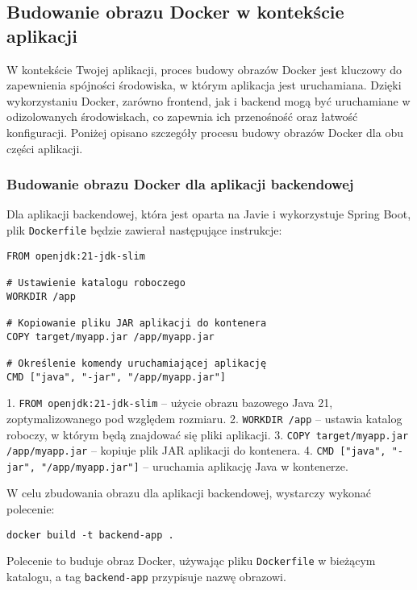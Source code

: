 \subsection{Budowanie obrazu Docker w kontekście aplikacji}

W kontekście Twojej aplikacji, proces budowy obrazów Docker jest kluczowy do zapewnienia spójności środowiska, w którym aplikacja jest uruchamiana. Dzięki wykorzystaniu Docker, zarówno frontend, jak i backend mogą być uruchamiane w odizolowanych środowiskach, co zapewnia ich przenośność oraz łatwość konfiguracji. Poniżej opisano szczegóły procesu budowy obrazów Docker dla obu części aplikacji.

\subsubsection{Budowanie obrazu Docker dla aplikacji backendowej}

Dla aplikacji backendowej, która jest oparta na Javie i wykorzystuje Spring Boot, plik \texttt{Dockerfile} będzie zawierał następujące instrukcje:

\begin{verbatim}
FROM openjdk:21-jdk-slim

# Ustawienie katalogu roboczego
WORKDIR /app

# Kopiowanie pliku JAR aplikacji do kontenera
COPY target/myapp.jar /app/myapp.jar

# Określenie komendy uruchamiającej aplikację
CMD ["java", "-jar", "/app/myapp.jar"]
\end{verbatim}

1. \texttt{FROM openjdk:21-jdk-slim} – użycie obrazu bazowego Java 21, zoptymalizowanego pod względem rozmiaru.
2. \texttt{WORKDIR /app} – ustawia katalog roboczy, w którym będą znajdować się pliki aplikacji.
3. \texttt{COPY target/myapp.jar /app/myapp.jar} – kopiuje plik JAR aplikacji do kontenera.
4. \texttt{CMD ["java", "\texttt{-}jar", "/app/myapp.jar"]} – uruchamia aplikację Java w kontenerze.

W celu zbudowania obrazu dla aplikacji backendowej, wystarczy wykonać polecenie:

\begin{verbatim}
docker build -t backend-app .
\end{verbatim}

Polecenie to buduje obraz Docker, używając pliku \texttt{Dockerfile} w bieżącym katalogu, a tag \texttt{backend-app} przypisuje nazwę obrazowi.

